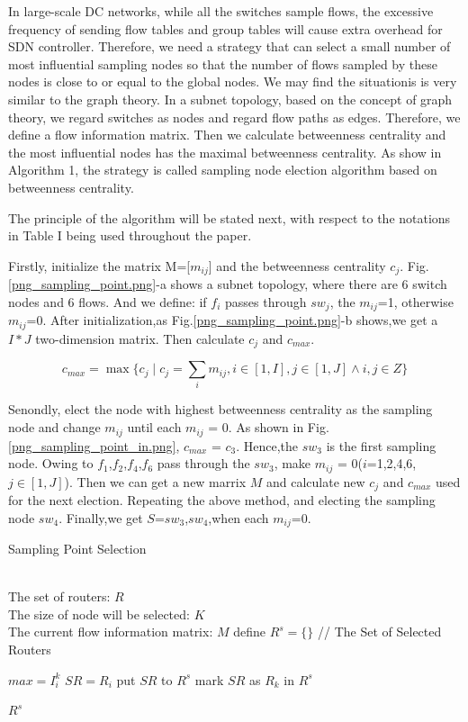 \documentclass[conference,compsoc]{IEEEtran}
\begin{document}
In large-scale DC networks, while all the switches sample flows, the excessive frequency of sending flow tables and group tables will cause extra overhead for SDN controller. Therefore, we need a strategy that can select a small number of most influential sampling nodes so that the number of flows sampled by these nodes is close to or equal to the  global nodes. 
We may find the situationis is very similar to the graph theory. In a subnet topology, based on the concept of graph theory, we regard switches as nodes and regard flow paths as edges. Therefore, we define a flow information matrix. Then we calculate betweenness centrality and the most influential nodes has the maximal betweenness centrality. As show in Algorithm 1, the strategy is called sampling node election algorithm based on betweenness centrality.

The principle of the algorithm will be stated next, with respect to the notations in Table I being used throughout the paper.

Firstly, initialize the matrix M=[$m_{ij}$] and the betweenness centrality $c_j$. Fig.\ref{png_sampling_point.png}-a shows a subnet topology, where there are 6 switch nodes and 6 flows. And we define: if $f_i$ passes through $sw_j$, the $m_{ij}$=1, otherwise $m_{ij}$=0. After initialization,as Fig.\ref{png_sampling_point.png}-b shows,we get a $I \ast J$ two-dimension matrix. Then calculate $c_j$ and $c_{max}$.

\begin{equation}
 c_{max} = \max\{ c_j \mid c_j=\sum_i{m_{ij}},i\in[1,I],j\in[1,J] \wedge  i,j\in Z\} 
\end{equation}

Senondly, elect the node with highest betweenness centrality as the sampling node and change $m_{ij}$ until each $m_{ij}$ = 0. As shown in Fig.\ref{png_sampling_point_in.png}, $c_{max}$ = $c_3$. Hence,the $sw_3$ is the first sampling node. Owing to $f_1$,$f_2$,$f_4$,$f_6$ pass through the $sw_3$, make $m_{ij}$ = 0($i$=1,2,4,6,$j \in [1,J]$). Then we can get a new marrix $M$ and calculate new $c_j$ and $c_{max}$ used for the next election. Repeating the above method, and electing the sampling node $sw_4$. Finally,we get $S$={$sw_3$,$sw_4$},when each $m_{ij}$=0.  




\begin{algorithm}[h]
\caption{Sampling Point Selection}
\begin{algorithmic}[1]
\REQUIRE ~~\\ The set of routers: $ R$ \\  The size of node will be selected: $K$ \\ The current flow information matrix: $M$
\STATE define $R^s=\{\}$  //  The Set of Selected Routers


\STATE $max = I_i^k$
\STATE $SR = R_i$
\ENDIF
\ENDFOR
\STATE put $SR$ to $R^s$
\STATE mark $SR$ as $R_k$ in $R^s$
\ENDFOR

\RETURN $R^s$
\label{code:recentEnd}
\end{algorithmic}
\end{algorithm}
\end{document}
